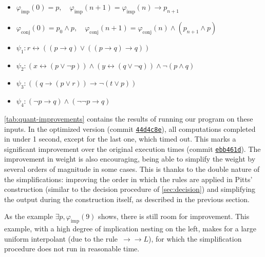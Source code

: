 \documentclass[english,final]{jflart}
\def\BaseUrlCode{https://github.com/hferee/UIML}
\def\CommitOrig{ebb461dd334ce10ceeb00ebaf6094778e2f03c4e} %
\def\CommitOrigShort{ebb461d}
\def\CommitOpt{44d4c8ed2ad8a725c4a5863d470b191063f29db8} %
\def\CommitOptShort{44d4c8e}
\theoremstyle{definition}
\theoremstyle{plain}
\renewcommand{\phi}{\varphi}
\begin{document}
\begin{itemize} \label{def:test-formulas}
	\item $\phi_{\text{imp}}(0) = p, \quad \phi_{\text{imp}}(n+1) = \phi_{\text{imp}}(n) \rightarrow p_{n+1}$
	\item $\phi_{\text{conj}}(0) = p_0 \wedge p, \quad \phi_{\text{conj}}(n+1) = \phi_{\text{conj}}(n) \wedge (p_{n+1} \wedge p)$
	\item $\psi_1: r \leftrightarrow ((p \rightarrow q) \vee ((p \rightarrow q) \rightarrow q))$
	\item $\psi_2: (x \leftrightarrow (p \vee \lnot p)) \wedge (y \leftrightarrow (q \vee \lnot q)) \wedge \lnot (p \wedge q)$
	\item $\psi_3: ((q\rightarrow (p \vee r))\rightarrow \lnot (t \vee p))$
	\item $\psi_4: (\neg p \to q) \wedge (\neg \neg p \to q)$
\end{itemize}



\cref{tab:quant-improvements} contains the results of running our program on these inputs. In the optimized version (commit \href{\BaseUrlCode/tree/\CommitOpt}{\texttt{\CommitOptShort}}), all computations completed in under 1 second, except for the last one, which timed out.
This marks a significant improvement over the original execution times 
(commit \href{\BaseUrlCode/tree/\CommitOrig}{\texttt{\CommitOrigShort}}). 
The improvement in weight is also encouraging, being able to simplify the weight by several orders of magnitude in some cases. This is thanks to the double nature of the simplifications: improving the order in which the rules are applied in Pitts' construction (similar to the decision procedure of \cref{sec:decision}) and simplifying the output during the construction itself, as described in the previous section.

As the example $\exists p, \phi_{\text{imp}} (9)$ shows, there is still room for improvement. This example, with a high degree of implication nesting on the left, makes for 
a large uniform interpolant (due to the rule~$\rightarrow\rightarrow L$), for which the simplification procedure does not run in reasonable time.

 


\end{document}
